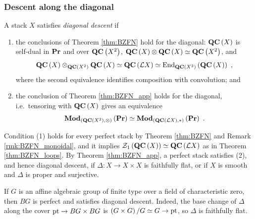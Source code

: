 \subsubsection{Descent along the diagonal}
\label{sec:diag_descent}

\begin{defn}
\label{defn:diag_descent}
A stack $X$ satisfies \emph{diagonal descent} if
\begin{enumerate}
\item the conclusions of Theorem \ref{thm:BZFN} hold for the diagonal: $\mathbf{QC}\left(X\right)$ is
self-dual in $\mathbf{Pr}$ and over $\mathbf{QC}\left(X^2\right)$,
$\mathbf{QC}\left(X\right)\otimes\mathbf{QC}\left(X\right)\simeq\mathbf{QC}\left(X^2\right)$, and
\begin{equation*}
\QC\left(X\right)\otimes_{\QC\left(X^2\right)}\QC\left(X\right)\simeq\QC\left(\cL X\right)
\simeq\End_{\QC\left(X^2\right)}\left(\QC\left(X\right)\right) \ ,
\end{equation*}
where the second equivalence identifies composition with convolution; and
\item the conclusion of Theorem \ref{thm:BZFN_app} holds for the diagonal, i.e.\ tensoring
with $\mathbf{QC}\left(X\right)$ gives an equivalence
\begin{equation*}
\Mod_{\left(\QC\left(X^2\right),\otimes\right)}\left(\Pre\right)\simeq
\Mod_{\left(\QC\left(\cL X\right),*\right)}\left(\Pre\right) \ .
\end{equation*}
\end{enumerate}
\end{defn}

Condition (1) holds for every perfect stack by Theorem \ref{thm:BZFN} and Remark
\ref{rmk:BZFN_monoidal}, and it implies $\mathcal{Z}_1\left(\mathbf{QC}\left(X\right)\right)\simeq\mathbf{QC}\left(\mathcal{L} X\right)$
as in Theorem \ref{thm:BZFN_loops}.
By Theorem \ref{thm:BZFN_app}, a perfect stack satisfies (2), and hence diagonal descent,
if $\Delta\colon X\to X\times X$ is faithfully flat, or if $X$ is smooth and $\Delta$ is
proper and surjective.

\begin{exm}
\label{exm:BG_diag_descent}
If $G$ is an affine algebraic group of finite type over a field of characteristic zero, then
$BG$ is perfect \cite[\S 3.3]{BZFN} and satisfies diagonal descent.
Indeed, the base change of $\Delta$ along the cover $\text{pt}\to BG\times BG$ is
$\left(G\times G\right)/G\simeq G\to\text{pt}$, so $\Delta$ is faithfully flat.
\end{exm}

